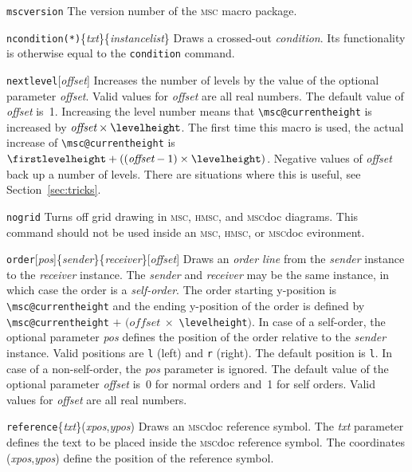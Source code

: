 \documentclass[a4paper]{article}
\newcommand{\cmd}[1]{\texttt{\bslash #1}}
\newcommand{\acro}[1]{{\scshape\lowercase{#1}}}
\newcommand\MSC{\acro{MSC}}
\newcommand\HMSC{\acro{HMSC}}
\newcommand{\MSCdoc}{\MSC{}doc}
\newcommand{\mscpack}{\MSC{} macro package}
\newcommand{\opt}[1]{[#1]}
\newcommand{\cmdarg}[1]{\{\emph{#1}\}}
\newcommand{\coordarg}[1]{\emph{#1}}
\newcommand{\coordargs}[2]{(\coordarg{#1},\coordarg{#2})}
\newenvironment{defs}{%
  \begin{list}{}%
              {\setlength{\labelwidth}{0pt}%
               \setlength{\labelsep}{1em}%
               \setlength{\leftmargin}{1em}%
               \setlength{\parsep}{1ex}%
               \setlength{\listparindent}{0pt}%
               \setlength{\rightmargin}{0pt}%
               \renewcommand{\makelabel}[1]{##1}%
               \raggedright%
              }%
  }{%
  \end{list}}
\begin{document}
\begin{defs}
\item[\cmd{mscversion}] The version number of the \mscpack.

\item[\cmd{ncondition(*)}\{\emph{txt}\}\{\emph{instancelist}\}] Draws
  a crossed-out \emph{condition}. Its functionality is otherwise equal
  to the \verb+condition+ command.

\item[\cmd{nextlevel}\opt{\emph{offset}}] Increases the number of
levels by the value of the optional parameter \emph{offset}. Valid 
values for \emph{offset} are all real numbers. The
default value of \emph{offset} is~1. Increasing the level number means
that \verb|\msc@currentheight| is increased by $\textit{offset} \times
\verb|\levelheight|$. The first time this macro is used, the actual
increase of \verb|\msc@currentheight| is $\verb|\firstlevelheight| +
((\textit{offset} - 1) \times \verb|\levelheight|)$. Negative values
of \emph{offset} back up a number of levels. There are situations
where this is useful, see Section~\ref{sec:tricks}.

\item[\cmd{nogrid}] Turns off grid drawing in \MSC, \HMSC, and
\MSCdoc{} diagrams. This command should not be used inside an \MSC,
\HMSC, or \MSCdoc{} evironment.

\item[\cmd{order}\opt{\emph{pos}}\{\emph{sender}\}\{\emph{receiver}\}\opt{\emph{offset}}]
Draws an \emph{order line} from the \emph{sender} instance to the
\emph{receiver} instance. The \emph{sender} and \emph{receiver} may be
the same instance, in which case the order is a \emph{self-order}. The
order starting y-position is \verb|\msc@currentheight| and the ending
y-position of the order is defined by \verb|\msc@currentheight| $+$
$(\textit{offset}\ \times $ \verb|\levelheight|$)$. In case of a
self-order, the optional parameter \emph{pos} defines the position of
the order relative to the \emph{sender} instance. Valid positions are
\verb|l| (left) and \verb|r| (right). The default position is
\verb|l|. In case of a non-self-order, the \emph{pos} parameter is
ignored. The default value of the optional parameter \emph{offset}
is~0 for normal orders and~1 for self orders. Valid values for 
\emph{offset} are all real numbers.

\item[\cmd{reference}\cmdarg{txt}\coordargs{xpos}{ypos}] Draws an
\MSCdoc{} reference symbol. The \emph{txt} parameter defines the text to
be placed inside the \MSCdoc{} reference symbol. The coordinates
\coordargs{xpos}{ypos} define the position of the reference symbol.


\end{defs}
\end{document}
